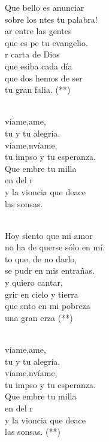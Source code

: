 \documentclass[12pt]{article}
\begin{document}
\begin{multicols*}{2}
\begin{cancion}%
	Que bello es anunciar \\
	sobre los ntes tu palabra!\\
	ar entre las gentes \\
	que es pe tu evangelio.\\
	r carta de Dios\\
	que esiba cada día\\
	que dos hemos de ser \\
	tu gran falia. (**)\\\jump\\
	\begin{chorus}%
	víame,ame, \\
	tu y tu alegría.\\
	víame,nvíame,\\
	tu impso y tu esperanza.\\
	Que embre tu milla\\
	en  del r\\
	y la vioncia que deace \\
	las sonsas.\\
	\end{chorus}%
	\jump\\
Hoy siento que mi amor \\
	no ha de querse sólo en mí.\\
	to que, de no darlo,\\
	se pudr en mis entrañas.\\
	y quiero cantar,\\
	grir en cielo y tierra\\
	que snto en mi pobreza \\
	una gran erza (**)\\\jump\\
	\begin{chorus}%
	víame,ame, \\
	tu y tu alegría.\\
	víame,nvíame,\\
	tu impso y tu esperanza.\\
	Que embre tu milla\\
	en  del r\\
	y la vioncia que deace \\
	las sonsas. (**)\\
	\end{chorus}%
	\jump\\
\end{cancion}%


\end{multicols*}
\end{document}
